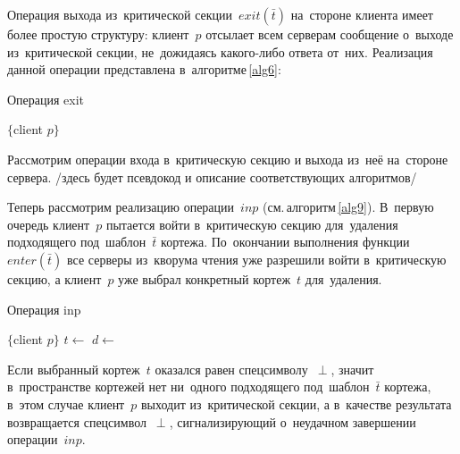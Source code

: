 Операция выхода из~критической секции~$exit(\bar t)$ на~стороне клиента имеет более простую структуру: клиент~$p$ отсылает всем серверам сообщение о~выходе из~критической секции, не~дожидаясь какого-либо ответа от~них. Реализация данной операции представлена в~алгоритме\,\ref{alg6}:

\begin{algorithm}[H]
	\caption{Операция exit}\label{alg6}
	\begin{algorithmic}[1]
		\Statex $\{$client $p \}$
		\State {}
		\EndFor
		\EndProcedure
	\end{algorithmic}
\end{algorithm}

Рассмотрим операции входа в~критическую секцию и выхода из~неё на~стороне сервера. /здесь будет псевдокод и описание соответствующих алгоритмов/

Теперь рассмотрим реализацию операции~$inp$ (см.\,алгоритм\,\ref{alg9}). В~первую очередь клиент~$p$ пытается войти в~критическую секцию для~удаления подходящего под~шаблон~$\bar t$ кортежа. По~окончании выполнения функции~$enter(\bar t)$ все серверы из~кворума чтения уже разрешили войти в~критическую секцию, а клиент~$p$ уже выбрал конкретный кортеж~$t$ для~удаления.

\begin{algorithm}[H]
	\caption{Операция inp}\label{alg9}
	\begin{algorithmic}[1]
		\Statex $\{$client $p \}$
		\Repeat
			\State $t \gets$ 
				\State {}
				\State \Return{$\perp$}
			\EndIf
			\State $d \gets$ 
			\State {}
		\State {}
		\EndFunction
	\end{algorithmic}
\end{algorithm}

Если выбранный кортеж~$t$ оказался равен спецсимволу~$\perp$, значит в~пространстве кортежей нет ни~одного подходящего под~шаблон~$\bar t$ кортежа, в~этом случае клиент~$p$ выходит из~критической секции, а в~качестве результата возвращается спецсимвол~$\perp$, сигнализирующий о~неудачном завершении операции~$inp$.

